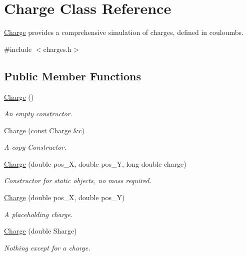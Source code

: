 \hypertarget{classCharge}{\section{Charge Class Reference}
\label{classCharge}
}


\hyperlink{classCharge}{Charge} provides a comprehensive simulation of charges, defined in couloumbs.  




{\ttfamily \#include $<$charges.\-h$>$}

\subsection*{Public Member Functions}
\begin{DoxyCompactItemize}
\item 
\hyperlink{classCharge_a7befb68db021c18d8664681545a0ecab}{Charge} ()
\begin{DoxyCompactList}\small\item\em An empty constructor. \end{DoxyCompactList}\item 
\hyperlink{classCharge_a1291fa5e938b4e980e6458a5615fa301}{Charge} (const \hyperlink{classCharge}{Charge} \&c)
\begin{DoxyCompactList}\small\item\em A copy Constructor. \end{DoxyCompactList}\item 
\hyperlink{classCharge_aece350b65235394a14d14866b81dd519}{Charge} (double pos\-\_\-\-X, double pos\-\_\-\-Y, long double charge)
\begin{DoxyCompactList}\small\item\em Constructor for static objects, no mass required. \end{DoxyCompactList}\item 
\hyperlink{classCharge_a63abe4cf2804639423d798102ae24477}{Charge} (double pos\-\_\-\-X, double pos\-\_\-\-Y)
\begin{DoxyCompactList}\small\item\em A placeholding charge. \end{DoxyCompactList}\item 
\hyperlink{classCharge_a8834cef992c56080989c6a5bc3f5aef4}{Charge} (double Sharge)
\begin{DoxyCompactList}\small\item\em Nothing except for a charge. \end{DoxyCompactList}\item 

\end{DoxyCompactItemize}
